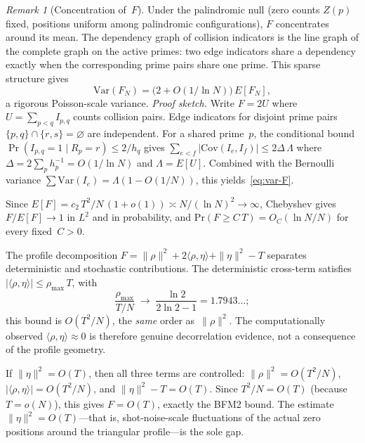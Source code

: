\documentclass[11pt]{article}
\theoremstyle{definition}
\theoremstyle{remark}
\newtheorem{remark}[theorem]{Remark}
\begin{document}
\begin{remark}[Concentration of~$F$]
\label{rem:F-concentration}
Under the palindromic null (zero counts
$Z(p)$ fixed, positions uniform among
palindromic configurations),
$F$ concentrates around its mean.
The dependency graph of collision
indicators is the line graph of the
complete graph on the active primes:
two edge indicators share a dependency
exactly when the corresponding prime
pairs share one prime.
This sparse structure gives
\begin{equation}\label{eq:var-F}
  \mathrm{Var}(F_N)
  = \bigl(2 + O(1/\ln N)\bigr)\,
  E[F_N],
\end{equation}
a rigorous Poisson-scale variance.
\emph{Proof sketch.}
Write $F = 2U$ where
$U = \sum_{p < q} I_{p,q}$ counts
collision pairs.
Edge indicators for disjoint prime pairs
$\{p,q\} \cap \{r,s\} = \varnothing$
are independent.
For a shared prime~$p$, the conditional
bound
$\Pr(I_{p,q} = 1 \mid R_p = r)
\le 2/h_q$ gives
$\sum_{e < f}|\mathrm{Cov}(I_e, I_f)|
\le 2\Delta\,\Lambda$
where $\Delta = 2\sum_p h_p^{-1}
= O(1/\ln N)$
and $\Lambda = E[U]$.
Combined with the Bernoulli variance
$\sum \mathrm{Var}(I_e)
= \Lambda(1 - O(1/N))$,
this yields~\eqref{eq:var-F}.

Since $E[F] = c_2\,T^2/N\,(1 + o(1))
\asymp N/(\ln N)^2 \to \infty$,
Chebyshev gives $F/E[F] \to 1$
in $L^2$ and in probability,
and $\mathrm{Pr}(F \ge C\,T) =
O_C(\ln N/N)$ for every fixed~$C > 0$.

The profile decomposition
$F = \|\rho\|^2 + 2\langle\rho,\eta
\rangle + \|\eta\|^2 - T$ separates
deterministic and stochastic
contributions.
The deterministic cross-term satisfies
$|\langle\rho,\eta\rangle|
\le \rho_{\max}\,T$, with
\[
  \frac{\rho_{\max}}{T/N}
  \;\longrightarrow\;
  \frac{\ln 2}{2\ln 2 - 1}
  = 1.7943\ldots;
\]
this bound is $O(T^2/N)$, the
\emph{same} order as~$\|\rho\|^2$.
The computationally observed
$\langle\rho,\eta\rangle \approx 0$ is
therefore genuine decorrelation
evidence, not a consequence of the
profile geometry.

If $\|\eta\|^2 = O(T)$, then all three
terms are controlled:
$\|\rho\|^2 = O(T^2/N)$,
$|\langle\rho,\eta\rangle| = O(T^2/N)$,
and $\|\eta\|^2 - T = O(T)$.
Since $T^2/N = O(T)$ (because
$T = o(N)$), this gives
$F = O(T)$, exactly the BFM2 bound.
The estimate $\|\eta\|^2 = O(T)$---that
is, shot-noise-scale fluctuations of the
actual zero positions around the
triangular profile---is the sole gap.
\end{remark}
\end{document}
